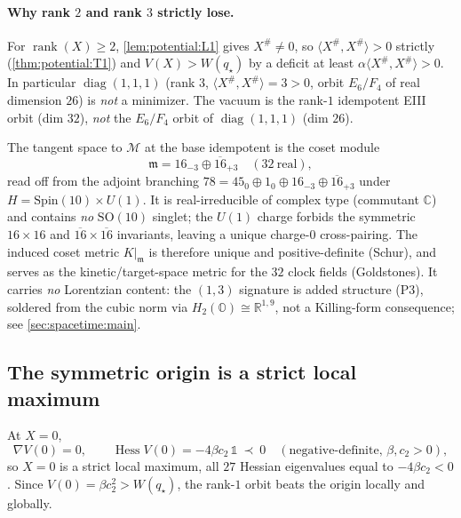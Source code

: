 \paragraph{Why rank $2$ and rank $3$ strictly lose.}
For $\operatorname{rank}(X)\ge2$, \autoref{lem:potential:L1} gives $X^\#\neq0$, so
$\langle X^\#,X^\#\rangle>0$ strictly (\autoref{thm:potential:T1}) and
$V(X)>W(q_\star)$ by a deficit at least $\alpha\langle X^\#,X^\#\rangle>0$. In particular
$\operatorname{diag}(1,1,1)$ (rank $3$, $\langle X^\#,X^\#\rangle=3>0$, orbit $E_6/F_4$ of
real dimension $26$) is \emph{not} a minimizer. The vacuum is the rank-$1$ idempotent EIII
orbit (dim $32$), \emph{not} the $E_6/F_4$ orbit of $\operatorname{diag}(1,1,1)$ (dim $26$).

\begin{remark}
\label{rmk:potential:tangent}
The tangent space to $\mathcal M$ at the base idempotent is the coset module
\begin{equation}
\label{eq:potential:cosettangent}
\mathfrak m=16_{-3}\oplus\overline{16}_{+3}\quad(32\ \text{real}),
\end{equation}
read off from the adjoint branching $78=45_0\oplus1_0\oplus16_{-3}\oplus\overline{16}_{+3}$
under $H=\mathrm{Spin}(10)\times U(1)$. It is real-irreducible of complex type (commutant
$\mathbb C$) and contains \emph{no} $\mathrm{SO}(10)$ singlet; the $U(1)$ charge forbids the
symmetric $16\times16$ and $\overline{16}\times\overline{16}$ invariants, leaving a unique
charge-$0$ cross-pairing. The induced coset metric $K|_{\mathfrak m}$ is therefore unique and
positive-definite (Schur), and serves as the kinetic/target-space metric for the $32$ clock
fields (Goldstones). It carries \emph{no} Lorentzian content: the $(1,3)$ signature is added
structure (P3), soldered from the cubic norm via $H_2(\mathbb O)\cong\mathbb R^{1,9}$, not a
Killing-form consequence; see \autoref{sec:spacetime:main}.
\end{remark}

\subsection{The symmetric origin is a strict local maximum}
\label{sec:potential:origin}

\begin{theorem}
\label{thm:potential:T5}
At $X=0$,
\begin{equation}
\label{eq:potential:hess0}
\nabla V(0)=0,\qquad
\operatorname{Hess}V(0)=-4\beta c_2\,\mathbb 1\ \prec\ 0
\quad(\text{negative-definite, }\beta,c_2>0),
\end{equation}
so $X=0$ is a strict local maximum, all $27$ Hessian eigenvalues equal to $-4\beta c_2<0$.
Since $V(0)=\beta c_2^2>W(q_\star)$, the rank-$1$ orbit beats the origin locally and globally.
\end{theorem}

